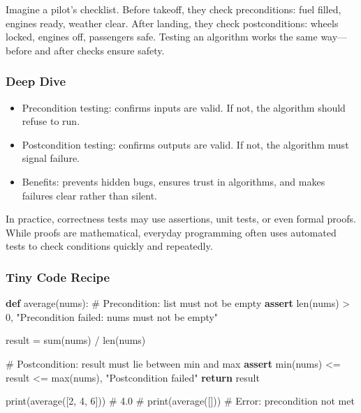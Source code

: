 \documentclass[
  letterpaper,
  DIV=11,
  numbers=noendperiod]{scrreprt}
\newenvironment{Shaded}{\begin{snugshade}}{\end{snugshade}}
\newcommand{\BuiltInTok}[1]{\textcolor[rgb]{0.00,0.23,0.31}{#1}}
\newcommand{\CommentTok}[1]{\textcolor[rgb]{0.37,0.37,0.37}{#1}}
\newcommand{\ControlFlowTok}[1]{\textcolor[rgb]{0.00,0.23,0.31}{\textbf{#1}}}
\newcommand{\DecValTok}[1]{\textcolor[rgb]{0.68,0.00,0.00}{#1}}
\newcommand{\KeywordTok}[1]{\textcolor[rgb]{0.00,0.23,0.31}{\textbf{#1}}}
\newcommand{\NormalTok}[1]{\textcolor[rgb]{0.00,0.23,0.31}{#1}}
\newcommand{\OperatorTok}[1]{\textcolor[rgb]{0.37,0.37,0.37}{#1}}
\newcommand{\StringTok}[1]{\textcolor[rgb]{0.13,0.47,0.30}{#1}}
\providecommand{\tightlist}{%
  \setlength{\itemsep}{0pt}\setlength{\parskip}{0pt}}
\begin{document}
Imagine a pilot's checklist. Before takeoff, they check preconditions:
fuel filled, engines ready, weather clear. After landing, they check
postconditions: wheels locked, engines off, passengers safe. Testing an
algorithm works the same way---before and after checks ensure safety.

\subsubsection{Deep Dive}\label{deep-dive-37}

\begin{itemize}
\tightlist
\item
  Precondition testing: confirms inputs are valid. If not, the algorithm
  should refuse to run.
\item
  Postcondition testing: confirms outputs are valid. If not, the
  algorithm must signal failure.
\item
  Benefits: prevents hidden bugs, ensures trust in algorithms, and makes
  failures clear rather than silent.
\end{itemize}

In practice, correctness tests may use assertions, unit tests, or even
formal proofs. While proofs are mathematical, everyday programming often
uses automated tests to check conditions quickly and repeatedly.

\subsubsection{Tiny Code Recipe}\label{tiny-code-recipe-65}

\begin{Shaded}
\begin{Highlighting}[]
\KeywordTok{def}\NormalTok{ average(nums):}
    \CommentTok{\# Precondition: list must not be empty}
    \ControlFlowTok{assert} \BuiltInTok{len}\NormalTok{(nums) }\OperatorTok{\textgreater{}} \DecValTok{0}\NormalTok{, }\StringTok{"Precondition failed: nums must not be empty"}
    
\NormalTok{    result }\OperatorTok{=} \BuiltInTok{sum}\NormalTok{(nums) }\OperatorTok{/} \BuiltInTok{len}\NormalTok{(nums)}
    
    \CommentTok{\# Postcondition: result must lie between min and max}
    \ControlFlowTok{assert} \BuiltInTok{min}\NormalTok{(nums) }\OperatorTok{\textless{}=}\NormalTok{ result }\OperatorTok{\textless{}=} \BuiltInTok{max}\NormalTok{(nums), }\StringTok{"Postcondition failed"}
    \ControlFlowTok{return}\NormalTok{ result}

\BuiltInTok{print}\NormalTok{(average([}\DecValTok{2}\NormalTok{, }\DecValTok{4}\NormalTok{, }\DecValTok{6}\NormalTok{]))  }\CommentTok{\# 4.0}
\CommentTok{\# print(average([]))       \# Error: precondition not met}
\end{Highlighting}
\end{Shaded}
\end{document}

